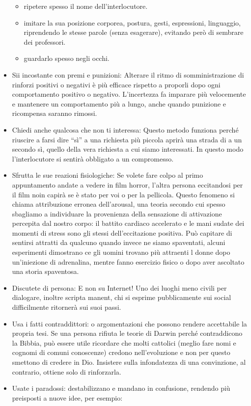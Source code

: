 \documentclass[12pt]{book} %
\begin{document}
\begin{itemize}
\begin{itemize}
\item ripetere spesso il nome dell'interlocutore.
\item imitare la sua posizione corporea, postura, gesti, espressioni, linguaggio, riprendendo le stesse parole (senza
esagerare), evitando però di sembrare dei professori.
\item guardarlo spesso negli occhi.
\end{itemize}
\item Sii incostante con premi e punizioni: Alterare il ritmo di somministrazione di rinforzi positivi o negativi è più
efficace rispetto a proporli dopo ogni comportamento positivo o negativo. L'incertezza fa imparare più velocemente e
mantenere un comportamento più a lungo, anche quando punizione e ricompensa saranno
rimossi.
\item Chiedi anche qualcosa che non ti interessa: Questo metodo funziona perché riuscire a farsi dire “sì” a una
richiesta più piccola aprirà una strada di a un secondo sì, quello della vera richiesta a cui siamo interessati. In
questo modo l'interlocutore si sentirà obbligato a un compromesso.
\item Sfrutta le sue reazioni fisiologiche: Se volete fare colpo al primo appuntamento andate a vedere in film horror,
l'altra persona eccitandosi per il film noin capirà se è stato per voi o per la pellicola. Questo fenomeno si chiama
attribuzione erronea dell'arousal, una teoria secondo cui spesso sbagliamo a individuare la provenienza della
sensazione di attivazione percepita dal nostro corpo: il battito cardiaco accelerato e le mani sudate dei momenti di
stress sono gli stessi dell'eccitazione positiva. Può capitare di sentirsi attratti da qualcuno quando invece ne siamo
spaventati, alcuni esperimenti dimostrano ce gli uomini trovano più attraenti l donne dopo un'iniezione di
adrenalina, mentre fanno esercizio fisico o dopo aver
ascoltato una storia spaventosa.
\item Discutete di persona: E non su Internet! Uno dei luoghi meno civili per dialogare, inoltre scripta manent, chi si
esprime pubblicamente sui social difficilmente ritornerà sui suoi passi.
\item Usa i fatti contraddittori: o argomentazioni che possono rendere accettabile la propria tesi. Se una persona
rifiuta le teorie di Darwin perché contraddicono la Bibbia, può essere utile ricordare che molti cattolici (meglio fare
nomi e cognomi di comuni conoscenze) credono nell'evoluzione e non per questo smettono di credere
in Dio. Insistere sulla infondatezza di una convinzione, al contrario, ottiene solo di rinforzarla.
\item Usate i paradossi: destabilizzano e mandano in confusione, rendendo più preisposti a nuove idee, per esempio:


\end{itemize}
\end{document}
